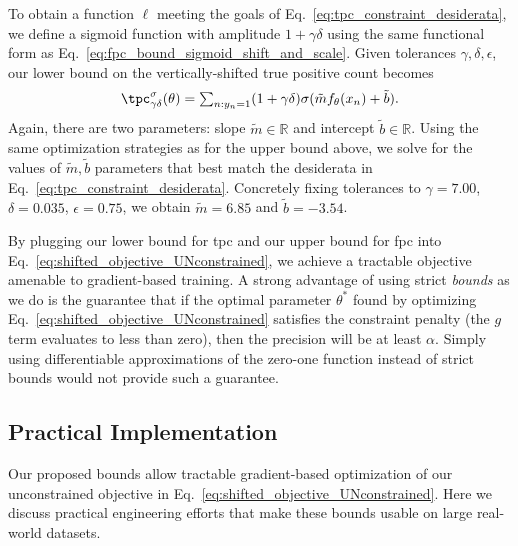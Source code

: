 To obtain a function $\ell$ meeting the goals of Eq.~\eqref{eq:tpc_constraint_desiderata}, we define a sigmoid function with amplitude $1+\gamma \delta$ using the same functional form as Eq.~\eqref{eq:fpc_bound_sigmoid_shift_and_scale}.
Given tolerances $\gamma,\delta,\epsilon$, our lower bound on the vertically-shifted true positive count becomes
\begin{align}
\tpc^\sigma_{\gamma\delta}(\theta) = \textstyle \sum_{n : y_n=1} (1+\gamma\delta) \sigma( \tilde{m} f_{\theta}(x_n) + \tilde{b}).
\label{eq:tpc_lower_bound}
\end{align}
Again, there are two parameters: slope $\tilde{m} \in \mathbb{R}$ and intercept $\tilde{b} \in \mathbb{R}$.
Using the same optimization strategies as for the upper bound above, we solve for the values of $\tilde{m},\tilde{b}$ parameters that best match the desiderata in Eq.~\eqref{eq:tpc_constraint_desiderata}. Concretely fixing tolerances to $\gamma=7.00$, $\delta=0.035$, $\epsilon=0.75$, we obtain $\tilde{m}=6.85$ and $\tilde{b}=-3.54$.

By plugging our lower bound for tpc and our upper bound for fpc into Eq.~\eqref{eq:shifted_objective_UNconstrained}, we achieve a tractable objective amenable to gradient-based training. A strong advantage of using strict \emph{bounds} as we do is the guarantee that if the optimal parameter $\theta^*$ found by optimizing Eq.~\eqref{eq:shifted_objective_UNconstrained} satisfies the constraint penalty (the $g$ term evaluates to less than zero), then the precision will be at least $\alpha$. Simply using differentiable approximations of the zero-one function instead of strict bounds would not provide such a guarantee.



\subsection{Practical Implementation}
Our proposed bounds allow tractable gradient-based optimization of our unconstrained objective in Eq.~\eqref{eq:shifted_objective_UNconstrained}.
Here we discuss practical engineering efforts that make these bounds usable on large real-world datasets.


